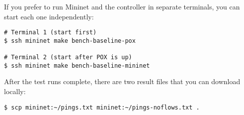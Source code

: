 If you prefer to run Mininet and the controller in separate terminals, you
can start each one independently:

\begin{Verbatim}
# Terminal 1 (start first)
$ ssh mininet make bench-baseline-pox

# Terminal 2 (start after POX is up)
$ ssh mininet make bench-baseline-mininet
\end{Verbatim}

After the test runs complete, there are two result files that you can
download locally:

\begin{Verbatim}
$ scp mininet:~/pings.txt mininet:~/pings-noflows.txt .
\end{Verbatim}
